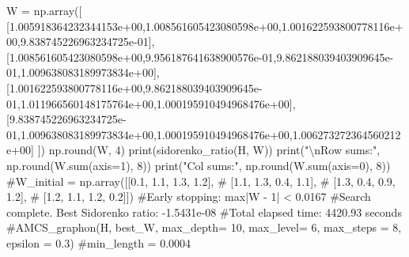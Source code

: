 \documentclass[
  letterpaper,
  DIV=11,
  numbers=noendperiod]{scrartcl}
\newenvironment{Shaded}{\begin{snugshade}}{\end{snugshade}}
\newcommand{\BuiltInTok}[1]{\textcolor[rgb]{0.00,0.23,0.31}{#1}}
\newcommand{\CharTok}[1]{\textcolor[rgb]{0.13,0.47,0.30}{#1}}
\newcommand{\CommentTok}[1]{\textcolor[rgb]{0.37,0.37,0.37}{#1}}
\newcommand{\DecValTok}[1]{\textcolor[rgb]{0.68,0.00,0.00}{#1}}
\newcommand{\FloatTok}[1]{\textcolor[rgb]{0.68,0.00,0.00}{#1}}
\newcommand{\NormalTok}[1]{\textcolor[rgb]{0.00,0.23,0.31}{#1}}
\newcommand{\OperatorTok}[1]{\textcolor[rgb]{0.37,0.37,0.37}{#1}}
\newcommand{\StringTok}[1]{\textcolor[rgb]{0.13,0.47,0.30}{#1}}
\begin{document}
\begin{Shaded}
\begin{Highlighting}[]
\NormalTok{W }\OperatorTok{=}\NormalTok{ np.array([}
\NormalTok{  [}\FloatTok{1.005918364232344153e+00}\NormalTok{,}\FloatTok{1.008561605423080598e+00}\NormalTok{,}\FloatTok{1.001622593800778116e+00}\NormalTok{,}\FloatTok{9.838745226963234725e{-}01}\NormalTok{],}
\NormalTok{[}\FloatTok{1.008561605423080598e+00}\NormalTok{,}\FloatTok{9.956187641638900576e{-}01}\NormalTok{,}\FloatTok{9.862188039403909645e{-}01}\NormalTok{,}\FloatTok{1.009638083189973834e+00}\NormalTok{],}
\NormalTok{[}\FloatTok{1.001622593800778116e+00}\NormalTok{,}\FloatTok{9.862188039403909645e{-}01}\NormalTok{,}\FloatTok{1.011966560148175764e+00}\NormalTok{,}\FloatTok{1.000195910494968476e+00}\NormalTok{],}
\NormalTok{[}\FloatTok{9.838745226963234725e{-}01}\NormalTok{,}\FloatTok{1.009638083189973834e+00}\NormalTok{,}\FloatTok{1.000195910494968476e+00}\NormalTok{,}\FloatTok{1.006273272364560212e+00}\NormalTok{]}
\NormalTok{])}
\NormalTok{np.}\BuiltInTok{round}\NormalTok{(W, }\DecValTok{4}\NormalTok{)}
\BuiltInTok{print}\NormalTok{(sidorenko\_ratio(H, W))}
\BuiltInTok{print}\NormalTok{(}\StringTok{"}\CharTok{\textbackslash{}n}\StringTok{Row sums:"}\NormalTok{, np.}\BuiltInTok{round}\NormalTok{(W.}\BuiltInTok{sum}\NormalTok{(axis}\OperatorTok{=}\DecValTok{1}\NormalTok{), }\DecValTok{8}\NormalTok{))}
\BuiltInTok{print}\NormalTok{(}\StringTok{"Col sums:"}\NormalTok{, np.}\BuiltInTok{round}\NormalTok{(W.}\BuiltInTok{sum}\NormalTok{(axis}\OperatorTok{=}\DecValTok{0}\NormalTok{), }\DecValTok{8}\NormalTok{))}
\CommentTok{\#W\_initial = np.array([[0.1, 1.1, 1.3, 1.2],}
\CommentTok{\#    [1.1, 1.3, 0.4, 1.1],}
\CommentTok{\#    [1.3, 0.4, 0.9, 1.2],}
\CommentTok{\#    [1.2, 1.1, 1.2, 0.2]])}
\CommentTok{\#Early stopping: max|W {-} 1| \textless{} 0.0167}
\CommentTok{\#Search complete. Best Sidorenko ratio: {-}1.5431e{-}08}
\CommentTok{\#Total elapsed time: 4420.93 seconds}
\CommentTok{\#AMCS\_graphon(H, best\_W, max\_depth= 10, max\_level= 6, max\_steps = 8, epsilon = 0.3)}
\CommentTok{\#min\_length = 0.0004}


\end{Highlighting}
\end{Shaded}
\end{document}
